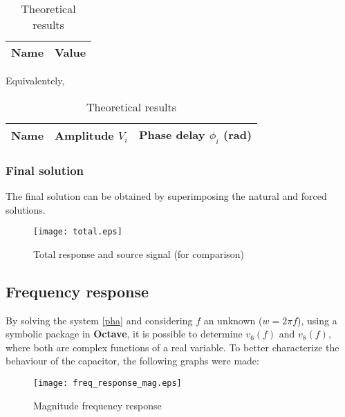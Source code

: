 \begin{table}[H]
  \centering
  \begin{tabular}{|c|c|}
    \hline
        {\bf Name} & {\bf Value} \\
        \hline
        \hline
        
        \hline
  \end{tabular}
  \caption{Theoretical results}
  \label{forced_res}
\end{table}

Equivalentely,

\begin{table}[H]
  \centering
  \begin{tabular}{|c|c|c|}
    \hline
        {\bf Name} & {\bf Amplitude $V_i$} & {\bf Phase delay $\phi_i$ (rad)} \\
        \hline
        \hline
        
        \hline
  \end{tabular}
  \caption{Theoretical results}
  \label{forcedamplitudes_res}
\end{table}

\subsubsection{Final solution}

The final solution can be obtained by superimposing the natural and forced solutions.

\begin{figure}[H]
  \centering
  \texttt{[image: total.eps]}
  \caption{Total response and source signal (for comparison)}
  \label{fig:tot}
\end{figure}

\subsection{Frequency response}

By solving the system \ref{pha} and considering $f$ an unknown ($w=2\pi f$), using a symbolic package in \textbf{Octave}, it is possible to determine $v_6(f)$ and $v_8(f)$, where both are complex functions of a real variable. To better characterize the behaviour of the capacitor, the following graphs were made:

\begin{figure}[H]
  \centering
  \texttt{[image: freq\_response\_mag.eps]}
  \caption{Magnitude frequency response}
  \label{freq_resp_mag}
\end{figure}

